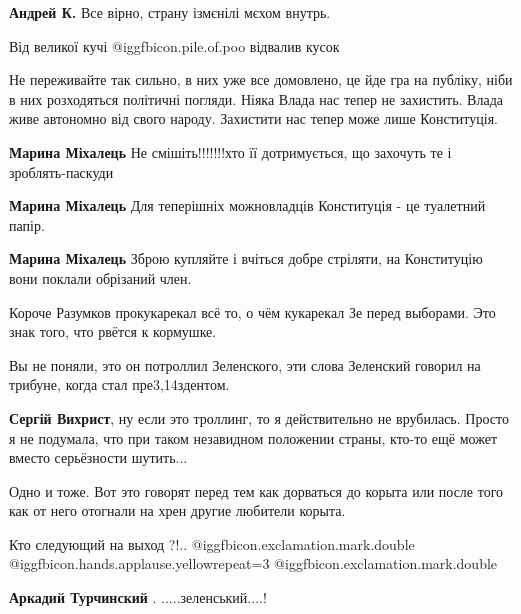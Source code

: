 \begin{itemize}
\begin{itemize} %
\textbf{Андрей К.} Все вірно, страну ізмєнілі мєхом внутрь.
\end{itemize} %

Від великої кучі @igg{fbicon.pile.of.poo} відвалив кусок


Не переживайте так сильно, в них уже все домовлено, це йде гра на публіку, ніби
в них розходяться політичні погляди. Ніяка Влада нас тепер не захистить. Влада
живе автономно від свого народу. Захистити нас тепер може лише Конституція.

\begin{itemize} %
\textbf{Марина Міхалець} Не смішіть!!!!!!!хто її дотримується, що захочуть те і зроблять-паскуди

\textbf{Марина Міхалець} Для теперішніх можновладців Конституція - це туалетний папір.

\textbf{Марина Міхалець} Зброю купляйте і вчіться добре стріляти, на Конституцію вони поклали обрізаний член.
\end{itemize} %


Короче Разумков прокукарекал всё то, о чём кукарекал Зе перед выборами. Это
знак того, что рвётся к кормушке.

\begin{itemize} %
Вы не поняли, это он потроллил Зеленского, эти слова Зеленский говорил на трибуне, когда стал пре3,14здентом.

\textbf{Сергій Вихрист}, ну если это троллинг, то я действительно не врубилась.
Просто я не подумала, что при таком незавидном положении страны, кто-то ещё
может вместо серьёзности шутить...
\end{itemize} %

Одно и тоже. Вот это говорят перед тем как дорваться до корыта или после того как от него отогнали на хрен другие любители корыта.

Кто следующий на выход ?!..
@igg{fbicon.exclamation.mark.double}   @igg{fbicon.hands.applause.yellow}{repeat=3} @igg{fbicon.exclamation.mark.double}

\begin{itemize} %
\textbf{Аркадий Турчинский} . .....зеленський....!


\end{itemize}
\end{itemize}
